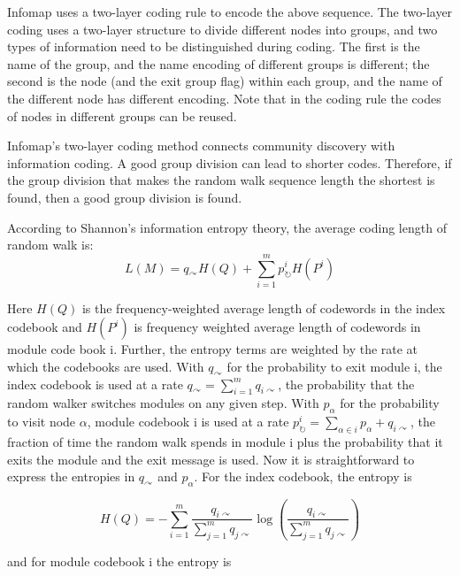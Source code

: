 \documentclass[fleqn,10pt]{SelfArx} %
\begin{document}
	Infomap\cite{rosvall2009map} uses a two-layer coding rule to encode the above sequence. The two-layer coding uses a two-layer structure to divide different nodes into groups, and two types of information need to be distinguished during coding. The first is the name of the group, and the name encoding of different groups is different; the second is the node (and the exit group flag) within each group, and the name of the different node has different encoding. Note that in the coding rule the codes of nodes in different groups can be reused.
	
	Infomap's two-layer coding method connects community discovery with information coding. A good group division can lead to shorter codes. Therefore, if the group division that makes the random walk sequence length the shortest is found, then a good group division is found.
	
	
	According to Shannon's information entropy theory, the average coding length of random walk is:
	\begin{equation}
		L(M)=q_{\curvearrowright} H(Q)+\sum_{i=1}^{m} p_{\circlearrowright}^{i} H\left(P^{i}\right)
	\end{equation}
	
	Here $H(Q)$ is the frequency-weighted average length of
	codewords in the index codebook and $H(P^i)$ is frequency weighted average length of codewords in module
	code book i.
	Further, the entropy terms are weighted by the rate at which the codebooks are used. 
	With $q_{\curvearrowright}$ for the probability to exit module i, the index codebook is used at a rate $q_{\curvearrowright}=\sum_{i=1}^{m} q_{i\curvearrowright}$, the probability that the random walker switches modules on any given step. 
	With $p_\alpha$ for the probability to visit node $\alpha$, module codebook
	i is used at a rate $p_{\circlearrowright}^{i}=\sum_{\alpha \in i} p_{\alpha}+q_{i\curvearrowright }$, the fraction of time the random walk spends in module i plus the probability that it exits the module and the exit message is
	used. Now it is straightforward to express the entropies
	in $q_{\curvearrowright}$ and $p_\alpha$. For the index codebook, the entropy is
	
	\begin{equation}
		H(Q)=-\sum_{i=1}^{m} \frac{q_{i \curvearrowright}}{\sum_{j=1}^{m} q_{j \curvearrowright}} \log \left(\frac{q_{i \curvearrowright}}{\sum_{j=1}^{m} q_{j \curvearrowright}}\right)
	\end{equation}	
	
	\noindent
	and for module codebook i the entropy is
	
\end{document}
